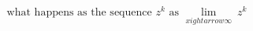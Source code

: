 \documentclass[preview]{standalone}
\begin{document}
\begin{align*}
\text{what happens as the sequence } z^k \text{ as } \lim_{x {
ightarrow} \infty} \ z^k
\end{align*}
\end{document}

